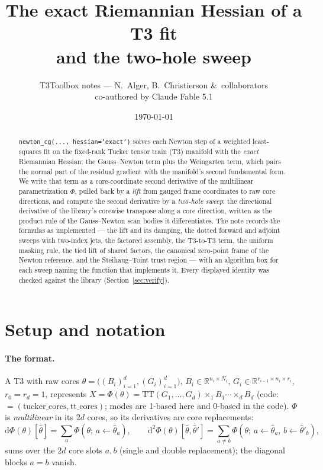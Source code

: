 \documentclass[11pt]{article}
\title{\bfseries The exact Riemannian Hessian of a T3 fit\\ and the two-hole sweep}
\author{T3Toolbox notes --- N.\ Alger, B.\ Christierson \&\ collaborators\\ co-authored by Claude Fable 5.1}
\date{\today}
\newcommand{\R}{\mathbb{R}}
\renewcommand{\th}{\theta}
\newcommand{\thh}{\hat\theta}
\theoremstyle{definition}
\theoremstyle{plain}
\begin{document}
\maketitle

\begin{abstract}
\noindent
\texttt{newton\_cg(..., hessian='exact')} solves each Newton step of a weighted least-squares fit on the
fixed-rank Tucker tensor train (T3) manifold with the \emph{exact} Riemannian Hessian: the Gauss--Newton term plus
the Weingarten term, which pairs the normal part of the residual gradient with the manifold's second fundamental
form. We write that term as a core-coordinate second derivative of the multilinear parametrization
$\Phi$, pulled back by a \emph{lift} from gauged frame coordinates to raw core directions, and compute the second
derivative by a \emph{two-hole sweep}: the directional derivative of the library's corewise transpose along a
core direction, written as the product rule of the Gauss--Newton scan bodies it differentiates. The note records
the formulas as implemented --- the lift and its damping, the dotted forward and adjoint sweeps with two-index
jets, the factored assembly, the T3-to-T3 term, the uniform masking rule, the tied lift of shared factors, the
canonical zero-point frame of the Newton reference, and the Steihaug--Toint trust region --- with an algorithm box
for each sweep naming the function that implements it. Every displayed identity was checked against the library
(Section~\ref{sec:verify}).
\end{abstract}

\section{Setup and notation}
\label{sec:setup}

\paragraph{The format.} A T3 with raw cores $\th = \big((B_i)_{i=1}^d, (G_i)_{i=1}^d\big)$, $B_i\in\R^{n_i\times N_i}$,
$G_i\in\R^{r_{i-1}\times n_i\times r_i}$, $r_0=r_d=1$, represents
$X = \Phi(\th) = \mathrm{TT}(G_1,\dots,G_d)\times_1 B_1\cdots\times_d B_d$ (code: 
$=(\text{tucker\_cores},\text{tt\_cores})$; modes are 1-based here and 0-based in the code). $\Phi$ is
\emph{multilinear} in its $2d$ cores, so its derivatives are core replacements:
\begin{equation}
  \label{eq:Dphi}
  \mathrm d\Phi(\th)[\thh] = \sum_{a} \Phi(\th;\, a\leftarrow \thh_a), \qquad
  \mathrm d^2\Phi(\th)[\thh,\thh'] = \sum_{a\neq b} \Phi(\th;\, a\leftarrow\thh_a,\, b\leftarrow\thh'_b),
\end{equation}
sums over the $2d$ core slots $a,b$ (single and double replacement); the diagonal blocks $a=b$ vanish.
\end{document}
